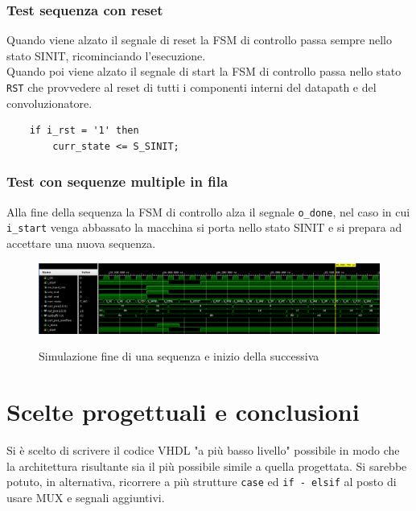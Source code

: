 \documentclass[12pt, a4paper]{article}
\begin{document}

\pagebreak

\vspace{10cm}

\subsubsection{Test sequenza con reset}

Quando viene alzato il segnale di reset la FSM di controllo passa sempre nello stato SINIT, ricominciando l'esecuzione.\\
\noindent Quando poi viene alzato il segnale di start la FSM di controllo passa nello stato \texttt{RST}
che provvedere al reset di tutti i componenti interni del datapath e del convoluzionatore.

\begin{verbatim}
    if i_rst = '1' then
        curr_state <= S_SINIT;
\end{verbatim}

\subsubsection{Test con sequenze multiple in fila}

Alla fine della sequenza la FSM di controllo alza il segnale \texttt{o\_done}, nel caso in cui \texttt{i\_start} venga abbassato
la macchina si porta nello stato SINIT e si prepara ad accettare una nuova sequenza.

\begin{figure}[h!]
    \centering
    \includegraphics[scale=0.3]{sim_mult_seq.png}
    \label{img:sim_multseq_change}
    \caption{Simulazione fine di una sequenza e inizio della successiva}
\end{figure}

\section{Scelte progettuali e conclusioni}

Si è scelto di scrivere il codice VHDL "a più basso livello" possibile in modo
che la architettura risultante sia il più possibile simile a quella progettata.
Si sarebbe potuto, in alternativa, ricorrere a più strutture \texttt{case} ed \texttt{if - elsif} 
al posto di usare MUX e segnali aggiuntivi.\\
\end{document}
